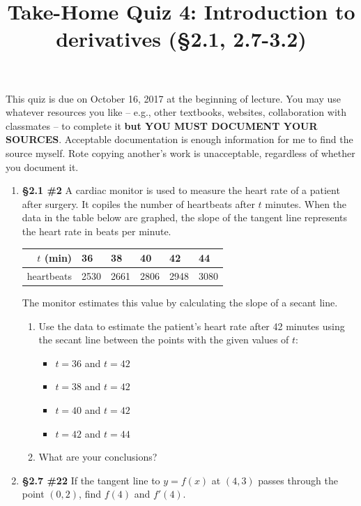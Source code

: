 \documentclass[%
]{article}
\title{\vspace{-3.5pc} 
	\flushleft \bf \Large Take-Home Quiz 4: Introduction to derivatives %
	 (\S2.1, 2.7-3.2)}
\date{}
\begin{document}
\maketitle

\vspace{-3pc}
 This quiz is due on October 16, 2017 at the beginning of lecture.  You may use whatever resources you like -- e.g., other textbooks, websites, collaboration with classmates -- to complete it \textbf{but YOU MUST DOCUMENT YOUR SOURCES}.  Acceptable documentation is enough information for me to find the source myself.  Rote copying another's work is unacceptable, regardless of whether you document it.  

\noindent\hrulefill

\begin{enumerate}
\item {\bf \S2.1 \#2} A cardiac monitor is used to measure the heart rate of a patient after surgery.  It copiles the number of heartbeats after $t$ minutes.  When the data in the table below are graphed, the slope of the tangent line represents the heart rate in beats per minute.
\begin{center}
\begin{tabular}{ r | l l l l l }
$t$ (min) & 36 & 38 & 40 & 42 & 44 \\
\hline
heartbeats & 2530 & 2661 & 2806 & 2948 & 3080
\end{tabular}
\end{center}
The monitor estimates this value by calculating the slope of a secant line.  	
	\begin{enumerate}
	\item Use the data to estimate the patient's heart rate after 42 minutes using the secant line between the points with the given values of $t$:
		\begin{itemize}
		\item $t=36$ and $t=42$
		\item $t=38$ and $t=42$
		\item $t=40$ and $t=42$
		\item $t=42$ and $t=44$
		\end{itemize}
	\item What are your conclusions?		
	\end{enumerate}

\item {\bf \S2.7 \#22} If the tangent line to $y=f(x)$ at $(4,3)$ passes through the point $(0,2)$, find $f(4)$ and $f'(4)$.
 

\end{enumerate}
\end{document}
